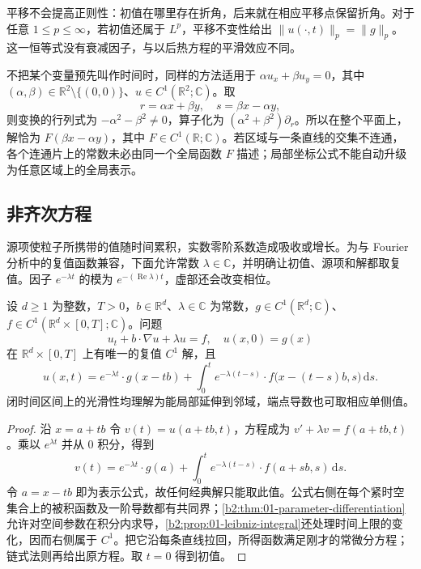 平移不会提高正则性：初值在哪里存在折角，后来就在相应平移点保留折角。对于任意 \(1\leq p\leq\infty\)，若初值还属于 \(L^p\)，平移不变性给出 \(\|u(\cdot,t)\|_p=\|g\|_p\)。这一恒等式没有衰减因子，与以后热方程的平滑效应不同。

\ProseParagraphBreak

不把某个变量预先叫作时间时，同样的方法适用于 \(\alpha u_x+\beta u_y=0\)，其中 \((\alpha,\beta)\in\mathbb R^2\setminus\{(0,0)\}\)、\(u\in C^1(\mathbb R^2;\mathbb C)\)。取
\[
 r=\alpha x+\beta y,\quad s=\beta x-\alpha y,
\]
则变换的行列式为 \(-\alpha^2-\beta^2\ne0\)，算子化为 \((\alpha^2+\beta^2)\partial_r\)。所以在整个平面上，解恰为 \(F(\beta x-\alpha y)\)，其中 \(F\in C^1(\mathbb R;\mathbb C)\)。若区域与一条直线的交集不连通，各个连通片上的常数未必由同一个全局函数 \(F\) 描述；局部坐标公式不能自动升级为任意区域上的全局表示。

\subsection{非齐次方程}
\label{b2:subsec:070103}

源项使粒子所携带的值随时间累积，实数零阶系数造成吸收或增长。为与 Fourier 分析中的复值函数兼容，下面允许常数 \(\lambda\in\mathbb C\)，并明确让初值、源项和解都取复值。因子 \(e^{-\lambda t}\) 的模为 \(e^{-(\operatorname{Re}\lambda)t}\)，虚部还会改变相位。

\begin{theorem}\label{b2:thm:07-constant-source}
设 \(d\geq1\) 为整数，\(T>0\)，\(b\in\mathbb R^d\)、\(\lambda\in\mathbb C\) 为常数，\(g\in C^1(\mathbb R^d;\mathbb C)\)、\(f\in C^1(\mathbb R^d\times[0,T];\mathbb C)\)。问题
\[
 u_t+b\cdot\nabla u+\lambda u=f,\quad u(x,0)=g(x)
\]
在 \(\mathbb R^d\times[0,T]\) 上有唯一的复值 \(C^1\) 解，且
\begin{equation}\label{b2:eq:07-constant-source}
 u(x,t)=e^{-\lambda t}\cdot g(x-tb)
 +\int_0^t e^{-\lambda(t-s)}\cdot f\bigl(x-(t-s)b,s\bigr)\,\mathrm ds.
\end{equation}
闭时间区间上的光滑性均理解为能局部延伸到邻域，端点导数也可取相应单侧值。
\end{theorem}
\begin{proof}
沿 \(x=a+tb\) 令 \(v(t)=u(a+tb,t)\)，方程成为
\(v'+\lambda v=f(a+tb,t)\)。乘以 \(e^{\lambda t}\) 并从 \(0\) 积分，得到
\[
 v(t)=e^{-\lambda t}\cdot g(a)
 +\int_0^t e^{-\lambda(t-s)}\cdot f(a+sb,s)\,\mathrm ds.
\]
令 \(a=x-tb\) 即为表示公式，故任何经典解只能取此值。公式右侧在每个紧时空集合上的被积函数及一阶导数都有共同界；\cref{b2:thm:01-parameter-differentiation}允许对空间参数在积分内求导，\cref{b2:prop:01-leibniz-integral}还处理时间上限的变化，因而右侧属于 \(C^1\)。把它沿每条直线拉回，所得函数满足刚才的常微分方程；链式法则再给出原方程。取 \(t=0\) 得到初值。
\end{proof}

